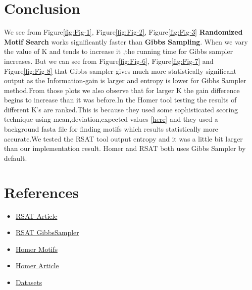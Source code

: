 \documentclass[11pt]{article}
\begin{document}
        
        
          
          
\section{Conclusion}
We see from Figure\ref{fig:Fig-1}, Figure\ref{fig:Fig-2}, Figure\ref{fig:Fig-3} \textbf{Randomized Motif Search} works significantly faster than \textbf{Gibbs Sampling}. When we vary the value of K and tends to increase it ,the running time for Gibbs sampler increases. But we can see from Figure\ref{fig:Fig-6}, Figure\ref{fig:Fig-7} and Figure\ref{fig:Fig-8} that Gibbs sampler gives much more statistically significant output as the Information-gain is larger and entropy is lower for Gibbs Sampler method.From those plots we also observe that for larger K the gain difference begins to increase than it was before.In the Homer tool testing the results of different K's are ranked.This is because they used some sophisticated scoring technique using mean,deviation,expected values [\href{http://homer.ucsd.edu/homer/motif/index.html}{here}] and they used a background fasta file for finding motifs which results statistically more accurate.We tested the RSAT tool output entropy and it was a little bit larger than our implementation result.
Homer and RSAT both uses Gibbs Sampler by default.
\section{References}
\begin{itemize}
    \item \href{https://academic.oup.com/nar/article/50/W1/W670/6584431}{RSAT Article}
    \item \href{http://rsat.sb-roscoff.fr/info-gibbs_form.cgi}{RSAT GibbsSampler}
    \item \href{http://homer.ucsd.edu/homer/motif/}{Homer Motifs}
    \item \href{https://www.ncbi.nlm.nih.gov/pmc/articles/PMC4763482/}{Homer Article}
    \item  \href{https://github.com/Superb-Man/Bio-Info/tree/master/data}{Datasets}
\end{itemize}
\end{document}
